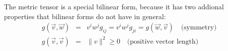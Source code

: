 The metric tensor is a special bilinear form, because it has two addional properties that
bilinear forms do not have in general:
\begin{equation}
    \label{eq:metric_tensor_special_additional_properties}
    \begin{array}{rcl}
        g(\vec{v},\vec{w}) &=& v^i w^j g_{ij} = v^i w^j g_{ji} = g(\vec{w},\vec{v})
        \quad\text{(symmetry)}\\
        g(\vec{v},\vec{v}) &=& \| v \|^2 \geq 0
        \quad\text{(positive vector length)}
    \end{array}
\end{equation}





\newpage